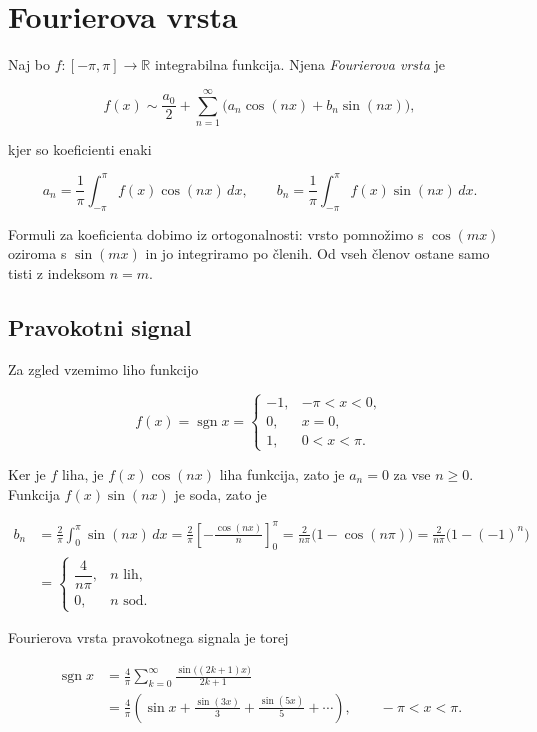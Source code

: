 \documentclass[a4paper]{article}
\begin{document}
\section{Fourierova vrsta}\label{fourierova-vrsta}

Naj bo \(f \colon [-\pi, \pi] \to \mathbb{R}\) integrabilna funkcija.
Njena \emph{Fourierova vrsta} je

\[f(x) \sim \frac{a_0}{2} + \sum_{n=1}^{\infty} \bigl( a_n \cos(nx) + b_n \sin(nx) \bigr),\]

kjer so koeficienti enaki

\[a_n = \frac{1}{\pi} \int_{-\pi}^{\pi} f(x) \cos(nx) \, dx, \qquad b_n = \frac{1}{\pi} \int_{-\pi}^{\pi} f(x) \sin(nx) \, dx.\]

Formuli za koeficienta dobimo iz ortogonalnosti: vrsto pomnožimo s
\(\cos(mx)\) oziroma s \(\sin(mx)\) in jo integriramo po členih. Od vseh
členov ostane samo tisti z indeksom \(n = m\).

\subsection{Pravokotni signal}\label{pravokotni-signal}

Za zgled vzemimo liho funkcijo

\[f(x) = \operatorname{sgn} x = \begin{cases} -1, & -\pi < x < 0, \\ 0, & x = 0, \\ 1, & 0 < x < \pi. \end{cases}\]

Ker je \(f\) liha, je \(f(x) \cos(nx)\) liha funkcija, zato je
\(a_n = 0\) za vse \(n \geq 0\). Funkcija \(f(x) \sin(nx)\) je soda,
zato je

\[\begin{aligned}
b_n &= \frac{2}{\pi} \int_{0}^{\pi} \sin(nx) \, dx
= \frac{2}{\pi} \left[ -\frac{\cos(nx)}{n} \right]_{0}^{\pi}
= \frac{2}{n\pi} \bigl( 1 - \cos(n\pi) \bigr)
= \frac{2}{n\pi} \bigl( 1 - (-1)^n \bigr) \\
&= \begin{cases} \dfrac{4}{n\pi}, & n \text{ lih}, \\ 0, & n \text{ sod}. \end{cases}
\end{aligned}\]

Fourierova vrsta pravokotnega signala je torej

\[\begin{aligned}
\operatorname{sgn} x &= \frac{4}{\pi} \sum_{k=0}^{\infty} \frac{\sin\bigl((2k + 1)x\bigr)}{2k + 1} \\
&= \frac{4}{\pi} \left( \sin x + \frac{\sin(3x)}{3} + \frac{\sin(5x)}{5} + \cdots \right), \qquad -\pi < x < \pi.
\end{aligned}\]
\end{document}

